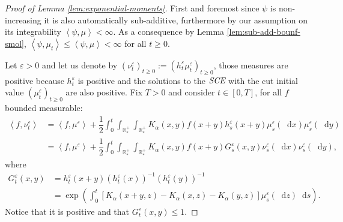 \documentclass[11pt,a4paper]{article}
\newcommand{\RRP}{\mathbb{R}^+_*}
\newcommand{\SCE}{\emph{SCE}}
\newcommand{\Proc}[1]{\left(#1\right)_{t\geq 0}}
\newcommand{\brac}[1]{\left\langle#1\right\rangle}
\newcommand{\dd}{\mathop{}\!\mathrm{d}}
\begin{document}
\begin{proof}[Proof of Lemma \ref{lem:exponential-moments}]
    First and foremost since $\psi$ is non-increasing it is also automatically sub-additive, furthermore by our assumption on its integrability $\brac{\psi,\mu} < \infty$. As a consequence by Lemma \ref{lem:sub-add-bounf-smol}, $\brac{\psi,\mu_t}\leq \brac{\psi,\mu} < \infty$ for all $t \geq 0$.

    Let $\varepsilon > 0$ and let us denote by $\Proc{\nu_t^\varepsilon} := \Proc{h_t^\varepsilon\mu_t^\varepsilon}$, those measures are positive because $h_t^\varepsilon$ is positive and the solutions to the $\SCE$ with the cut initial value $\Proc{\mu_t^\varepsilon}$ are also positive. Fix $T > 0$ and consider $t \in [0,T]$, for all $f$  bounded measurable:
    \begin{align*}
        \brac{f,\nu_t^\varepsilon} &= \brac{f,\mu^\varepsilon} + \dfrac12\int_0^t \int_{\RRP}\int_{\RRP}K_\alpha(x,y)f(x+y)h_s^\varepsilon(x+y) \mu_s^\varepsilon(\dd x) \mu_s^\varepsilon(\dd y) \\
        &= \brac{f,\mu^\varepsilon} + \dfrac12\int_0^t \int_{\RRP}\int_{\RRP}K_\alpha(x,y)f(x+y)G_s^\varepsilon(x,y) \nu_s^\varepsilon(\dd x) \nu_s^\varepsilon(\dd y),
    \end{align*}
    where
    \begin{align*}
        G_t^\varepsilon(x,y) &= h_t^\varepsilon(x+y)\left(h_t^\varepsilon(x)\right)^{-1}\left(h_t^\varepsilon(y)\right)^{-1} \\
        &= \exp{\left(\int_0^t \left[K_\alpha(x+y,z) - K_\alpha(x,z) - K_\alpha(y,z)\right]\mu^\varepsilon_s(\dd z) \dd s \right)}.
    \end{align*}
    Notice that it is positive and that $G_t^\varepsilon(x,y) \leq 1$.
    

\end{proof}
\end{document}
